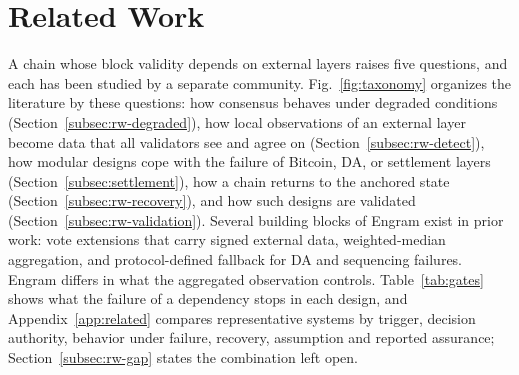 \section{Related Work}
\label{sec:related}

A chain whose block validity depends on external layers raises five
questions, and each has been studied by a separate community.
Fig.~\ref{fig:taxonomy} organizes the literature by these questions:
how consensus behaves under degraded conditions (Section~\ref{subsec:rw-degraded}),
how local observations of an external layer become data that all validators
see and agree on (Section~\ref{subsec:rw-detect}), how modular designs cope with
the failure of Bitcoin, DA, or settlement layers (Section~\ref{subsec:settlement}),
how a chain returns to the anchored state (Section~\ref{subsec:rw-recovery}),
and how such designs are validated (Section~\ref{subsec:rw-validation}).
Several building blocks of Engram exist in prior work: vote extensions that carry
signed external data, weighted-median aggregation, and protocol-defined
fallback for DA and sequencing failures. Engram differs in what the aggregated
observation controls. Table~\ref{tab:gates} shows what the failure of a dependency stops in each
design, and Appendix~\ref{app:related} compares representative systems by trigger,
decision authority, behavior under failure, recovery, assumption and reported
assurance; Section~\ref{subsec:rw-gap} states the combination left open.

